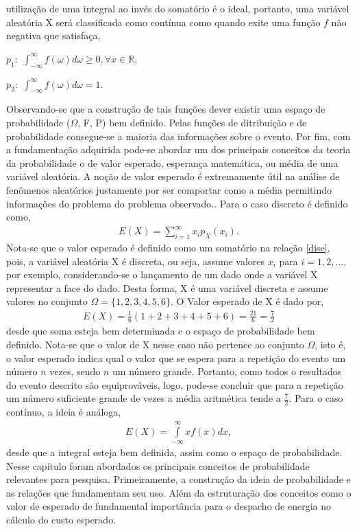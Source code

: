 utiliza\c{c}\~{a}o de uma integral ao inv\'{e}s do somat\'{o}rio \'{e} o ideal, portanto, uma vari\'{a}vel
aleat\'{o}ria X ser\'{a} classificada como cont\'{i}nua como quando exite uma fun\c{c}\~{a}o $f$ n\~{a}o
negativa que satisfa\c{c}a, 
	\begin{description} \centering 
		\item $p_1:$ $\int_{-\infty}^{\infty} f(\omega)
		 d\omega \geq 0 , \forall x \in \mathbb{R} $, 
		\item $p_2:$ $\int_{-\infty}^{\infty} f(\omega) d\omega =
		1.\qquad \quad \ \ $ 
	\end{description} 
Observando-se que a constru\c{c}\~{a}o de tais
fun\c{c}\~{o}es dever existir uma espa\c{c}o de probabilidade ($\Omega$, F, P) bem definido.  Pelas fun\c{c}\~{o}es
de ditribui\c{c}\~{a}o e de probabilidade consegue-se a maioria das informa\c{c}\~{o}es sobre o evento.
Por fim, com a fundamenta\c c\~ao adquirida pode-se abordar um dos principais conceitos da teoria da
probabilidade o de valor esperado, esperan\c{c}a matem\'{a}tica, ou m\'{e}dia de
uma vari\'{a}vel aleat\'oria. A no\c c\~ao de valor esperado \'e extremamente \'{u}til na an\'{a}lise de fen\^{o}menos
aleat\'{o}rios justamente por
ser comportar como a m\'{e}dia permitindo informa\c{c}\~{o}es do problema do problema observado..
Para o caso discreto \'e definido como, 
	\begin{align}
		\label{dise}
		E(X) = \sum\limits_{i = 1}^{\infty}x_ip_X(x_i).
	\end{align}
Nota-se que o valor esperado \'e
definido como um somat\'orio na rela\c c\~ao \ref{dise}, pois, a vari\'avel aleat\'oria X \'e discreta, ou seja, assume
valores $x_i$ para $i= 1,2, \dots$, por exemplo,
considerando-se o lan\c camento de um dado onde a vari\'avel X representar a face do dado. Desta forma, X \'e uma
vari\'avel discreta
e assume valores no conjunto
$\Omega = \{1,2,3,4,5,6\}$. O Valor esperado de X \'e dado por,
	\begin{align*}
		E(X) = \frac{1}{6}(1 + 2 + 3 + 4 + 5 + 6) = \frac{21}{6} = \frac{7}{2}
	\end{align*}
desde que soma esteja bem determinada e o espa\c{c}o de probabilidade bem definido.
Nota-se que o valor de X nesse caso n\~ao pertence ao conjunto $\Omega$, isto \'e, o valor esperado indica qual o valor
que se espera para a repeti\c c\~ao do evento um n\'umero  $n$ vezes, sendo $n$ um n\'umero grande. Portanto, como todos
o resultados do evento descrito s\~ao equiprov\'aveis, logo, pode-se concluir que para a repeti\c c\~ao um n\'umero
suficiente grande de vezes a m\'edia aritm\'etica tende a $\frac{7}{2}$. Para o caso
cont\'{i}nuo, a ideia \'{e} an\'{a}loga,
	\begin{align*}
		E(X) = \int\limits_{-\infty}^{\infty} xf(x) dx, 
	\end{align*}
desde que a integral esteja bem definida, assim como o espa\c{c}o de probabilidade. 
Nesse cap\'itulo foram abordados os principais conceitos de probabilidade relevantes para pesquisa. Primeiramente, a
constru\c c\~ao da ideia de probabilidade e as rela\c c\~oes que fundamentam seu uso. Al\'em da estrutura\c c\~ao dos 
conceitos como o valor de esperado de fundamental import\^ancia para o despacho de energia no c\'alculo do custo
esperado. 
